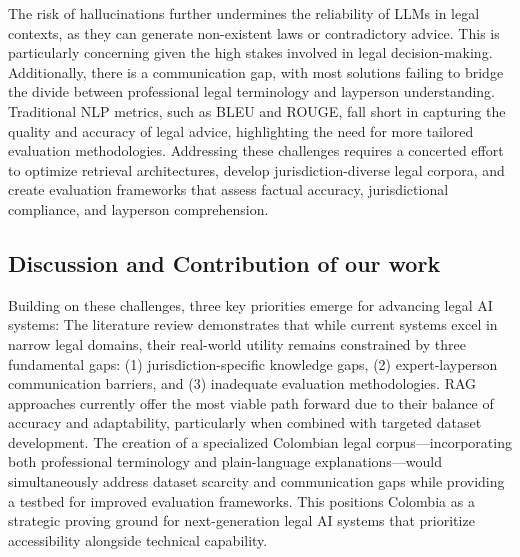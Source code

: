 The risk of hallucinations further undermines the reliability of LLMs in legal contexts, as they can generate non-existent 
laws or contradictory advice. This is particularly concerning given the high stakes involved in legal decision-making. Additionally, 
there is a communication gap, with most solutions failing to bridge the divide between professional legal terminology and layperson 
understanding. Traditional NLP metrics, such as BLEU and ROUGE, fall short in capturing the quality and accuracy of legal advice, 
highlighting the need for more tailored evaluation methodologies.
Addressing these challenges requires a concerted effort to optimize retrieval architectures, 
develop jurisdiction-diverse legal corpora, and create evaluation frameworks that assess factual accuracy, 
jurisdictional compliance, and layperson comprehension.

\subsection{Discussion and Contribution of our work}
Building on these challenges, three key priorities emerge for advancing legal AI systems:
%    
%    
The literature review demonstrates that while current systems excel in narrow legal domains, their real-world utility remains constrained 
by three fundamental gaps: (1) jurisdiction-specific knowledge gaps, (2) expert-layperson communication barriers, and 
(3) inadequate evaluation methodologies. RAG approaches currently offer the most viable path forward due to their balance 
of accuracy and adaptability, particularly when combined with targeted dataset development. The creation of a specialized Colombian 
legal corpus—incorporating both professional terminology and plain-language explanations—would simultaneously address dataset scarcity 
and communication gaps while providing a testbed for improved evaluation frameworks. This positions Colombia as a strategic proving ground 
for next-generation legal AI systems that prioritize accessibility alongside technical capability.

